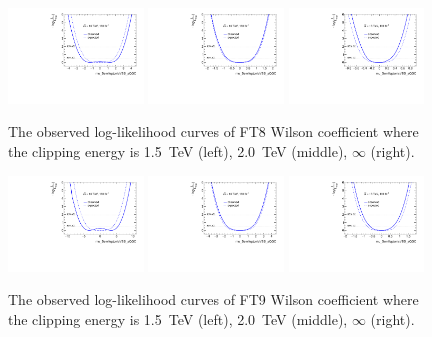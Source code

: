 \begin{figure}[ht]
    \centering
    \includegraphics[width=0.32\textwidth]{figures/aQGC/profileFT81500}
    	\includegraphics[width=0.32\textwidth]{figures/aQGC/profileFT82000}
        \includegraphics[width=0.32\textwidth]{figures/aQGC/profileFT8inf}
        \caption{The observed log-likelihood curves of FT8 Wilson coefficient where the clipping energy is 1.5~TeV (left), 2.0~TeV (middle), $\infty$ (right).}
        \label{fig:ProfileLLFT8}
\end{figure}
\begin{figure}[ht]
    \centering
    \includegraphics[width=0.32\textwidth]{figures/aQGC/profileFT91500}
    	\includegraphics[width=0.32\textwidth]{figures/aQGC/profileFT92000}
        \includegraphics[width=0.32\textwidth]{figures/aQGC/profileFT9inf}
        \caption{The observed log-likelihood curves of FT9 Wilson coefficient where the clipping energy is 1.5~TeV (left), 2.0~TeV (middle), $\infty$ (right).}
        \label{fig:ProfileLLFT9}
\end{figure}

